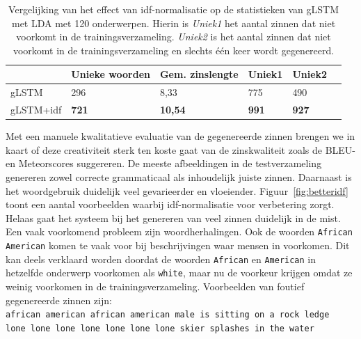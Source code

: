     \begin{table}
    	\centering
    	\begin{tabular}{llllll}
    		~                   & Unieke woorden & Gem. zinslengte & Uniek1 & Uniek2 \\ \hline
    		gLSTM         				  & 296   & 8,33   & 775   & 490  \\
    		
    		gLSTM+idf 				  & \textbf{721}   & \textbf{10,54}   & \textbf{991}   & \textbf{927}    \\\hline
    	\end{tabular}
    	\caption[Vergelijking effect idf-normalisatie op de statistieken van gLSTM met LDA met 120 onderwerpen]{Vergelijking van het effect van idf-normalisatie op de statistieken van gLSTM met LDA met 120 onderwerpen. Hierin is \emph{Uniek1} het aantal zinnen dat niet voorkomt in de trainingsverzameling. \emph{Uniek2} is het aantal zinnen dat niet voorkomt in de trainingsverzameling en slechts \'e\'en keer wordt gegenereerd.}
    	\label{table:idf-stats}
    \end{table}
    
Met een manuele kwalitatieve evaluatie van de gegenereerde zinnen brengen we in kaart of deze creativiteit sterk ten koste gaat van de zinskwaliteit zoals de BLEU- en Meteorscores suggereren. 
De meeste afbeeldingen in de testverzameling genereren zowel correcte grammaticaal als inhoudelijk juiste zinnen.
Daarnaast is het woordgebruik duidelijk veel gevarieerder en vloeiender.
Figuur~\ref{fig:betteridf} toont een aantal voorbeelden waarbij idf-normalisatie voor verbetering zorgt.
Helaas gaat het systeem bij het genereren van veel zinnen duidelijk in de mist. Een vaak voorkomend probleem zijn woordherhalingen. Ook de woorden \texttt{African American} komen te vaak voor bij beschrijvingen waar mensen in voorkomen. Dit kan deels verklaard worden doordat de woorden \texttt{African} en \texttt{American} in hetzelfde onderwerp voorkomen als \texttt{white}, maar nu de voorkeur krijgen omdat ze weinig voorkomen in de trainingsverzameling. Voorbeelden van foutief gegenereerde zinnen zijn:\\
\texttt{african american african american male is sitting on a rock ledge}\\
\texttt{lone lone lone lone lone lone lone skier splashes in the water}

